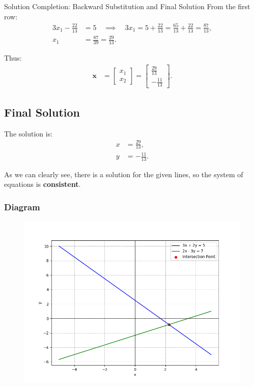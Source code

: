 \documentclass{beamer}
\begin{document}
	\begin{frame}{Solution Completion: Backward Substitution and Final Solution}
		From the first row:
		\begin{align}
			3x_1 - \frac{22}{13} &= 5 \quad \implies \quad 3x_1 = 5 + \frac{22}{13} = \frac{65}{13} + \frac{22}{13} = \frac{87}{13}, \\
			x_1 &= \frac{87}{39} = \frac{29}{13}.
		\end{align}
		
		Thus:
		\begin{align}
			\mathbf{x} &= \begin{bmatrix} x_1 \\ x_2 \end{bmatrix} = \begin{bmatrix} \frac{29}{13} \\ -\frac{11}{13} \end{bmatrix}.
		\end{align}
		
		\subsection*{Final Solution}
		The solution is:
		\begin{align}
			x &= \frac{29}{13}, \\
			y &= -\frac{11}{13}.
		\end{align}
		
		As we can clearly see, there is a solution for the given lines, so the system of equations is \textbf{consistent}.
	\end{frame}
	
	\begin{frame}
		\frametitle{Diagram}
		\begin{figure}[!ht]
			\centering
			\includegraphics[width=\linewidth]{figs/Fig.png}
		\end{figure}
	\end{frame}
\end{document}
